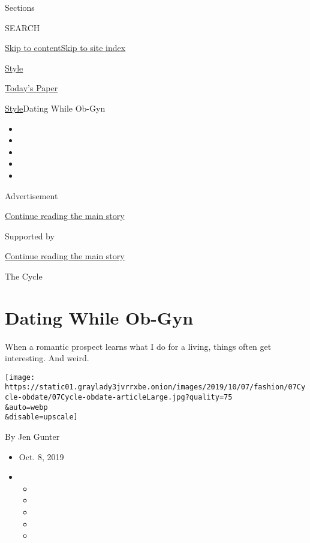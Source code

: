 Sections

SEARCH

\protect\hyperlink{site-content}{Skip to
content}\protect\hyperlink{site-index}{Skip to site index}

\href{https://www.nytimes3xbfgragh.onion/section/style}{Style}

\href{https://myaccount.nytimes3xbfgragh.onion/auth/login?response_type=cookie\&client_id=vi}{}

\href{https://www.nytimes3xbfgragh.onion/section/todayspaper}{Today's
Paper}

\href{/section/style}{Style}\textbar{}Dating While Ob-Gyn

\begin{itemize}
\item
\item
\item
\item
\item
\end{itemize}

Advertisement

\protect\hyperlink{after-top}{Continue reading the main story}

Supported by

\protect\hyperlink{after-sponsor}{Continue reading the main story}

The Cycle

\hypertarget{dating-while-ob-gyn}{%
\section{Dating While Ob-Gyn}\label{dating-while-ob-gyn}}

When a romantic prospect learns what I do for a living, things often get
interesting. And weird.

\texttt{[image: https://static01.graylady3jvrrxbe.onion/images/2019/10/07/fashion/07Cycle-obdate/07Cycle-obdate-articleLarge.jpg?quality=75\\\&auto=webp\\\&disable=upscale]}

By Jen Gunter

\begin{itemize}
\item
  Oct. 8, 2019
\item
  \begin{itemize}
  \item
  \item
  \item
  \item
  \item
  \end{itemize}
\end{itemize}

